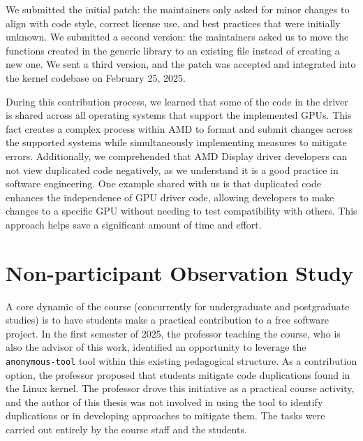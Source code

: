 \documentclass[10pt,conference]{IEEEtran}
\begin{document}


We submitted the initial patch: the maintainers only asked for minor changes to align with code style, correct license use, and best practices that were initially unknown. We submitted a second version: the maintainers asked us to move the functions created in the generic library to an existing file instead of creating a new one. We sent a third version, and the patch was accepted and integrated into the kernel codebase on February 25, 2025.

During this contribution process, we learned that some of the code in the driver is shared across all operating systems that support the implemented GPUs. This fact creates a complex process within AMD to format and submit changes across the supported systems while simultaneously implementing measures to mitigate errors. Additionally, we comprehended that AMD Display driver developers can not view duplicated code negatively, as we understand it is a good practice in software engineering. One example shared with us is that duplicated code enhances the independence of GPU driver code, allowing developers to make changes to a specific GPU without needing to test compatibility with others. This approach helps save a significant amount of time and effort.


\section{Non-participant Observation Study}

A core dynamic of the course (concurrently for undergraduate and postgraduate studies) is to have students make a practical contribution to a free software project. In the first semester of 2025, the professor teaching the course, who is also the advisor of this work, identified an opportunity to leverage the \texttt{anonymous-tool} tool within this existing pedagogical structure. As a contribution option, the professor proposed that students mitigate code duplications found in the Linux kernel. The professor drove this initiative as a practical course activity, and the author of this thesis was not involved in using the tool to identify duplications or in developing approaches to mitigate them. The tasks were carried out entirely by the course staff and the students.
\end{document}
